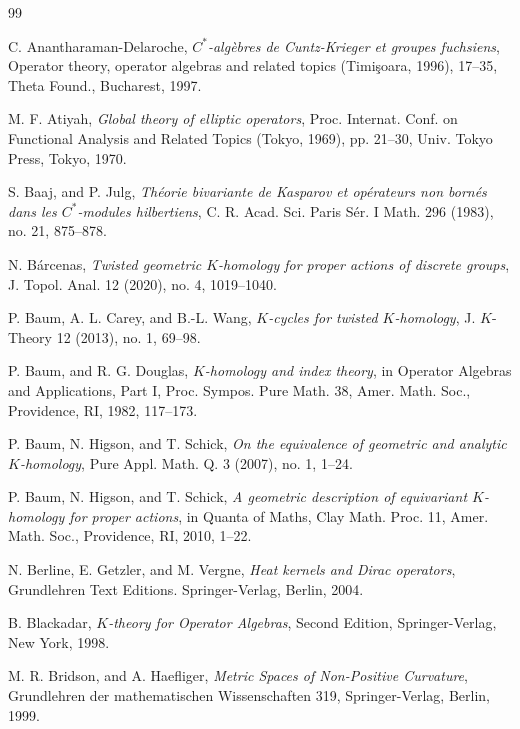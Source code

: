 \documentclass[a4paper,reqno]{amsart}
\numberwithin{equation}{section}
\theoremstyle{definition}
\theoremstyle{remark}
\begin{document}
\begin{thebibliography}{99}


 C. Anantharaman-Delaroche, \emph{$C^*$-algèbres de Cuntz-Krieger et groupes fuchsiens}, Operator theory, operator algebras and related topics (Timişoara, 1996), 17--35, Theta Found., Bucharest, 1997.


 M. F. Atiyah, \emph{Global theory of elliptic operators}, Proc. Internat. Conf. on Functional Analysis and Related Topics (Tokyo, 1969), pp. 21--30, Univ. Tokyo Press, Tokyo, 1970.


 S. Baaj, and P. Julg, \emph{Théorie bivariante de Kasparov et opérateurs non bornés dans les $C^{\ast} $-modules hilbertiens}, C. R. Acad. Sci. Paris Sér. I Math. 296 (1983), no. 21, 875--878.

 N. Bárcenas, \emph{Twisted geometric $K$-homology for proper actions of discrete groups}, J. Topol. Anal. 12 (2020), no. 4, 1019--1040.

 P. Baum, A. L. Carey, and B.-L. Wang, \emph{$K$-cycles for twisted $K$-homology}, J. $K$-Theory 12 (2013), no. 1, 69--98.

 P. Baum, and R. G. Douglas, \emph{$K$-homology and index theory}, in Operator Algebras and Applications, Part I, Proc. Sympos. Pure Math. 38, Amer. Math. Soc., Providence, RI, 1982, 117--173.

 P. Baum, N. Higson, and T. Schick, \emph{On the equivalence of geometric and analytic $K$-homology}, Pure Appl. Math. Q. 3 (2007), no. 1, 1--24.

 P. Baum, N. Higson, and T. Schick, \emph{A geometric description of equivariant $K$-homology for proper actions}, in Quanta of Maths, Clay Math. Proc. 11, Amer. Math. Soc., Providence, RI, 2010, 1--22.

 N. Berline, E. Getzler, and M. Vergne, \emph{Heat kernels and Dirac operators}, Grundlehren Text Editions. Springer-Verlag, Berlin, 2004.

 B. Blackadar, \emph{{$K$}-theory for Operator Algebras}, Second Edition, Springer-Verlag, New York, 1998.

 M. R. Bridson, and A. Haefliger, \emph{Metric Spaces of Non-Positive Curvature}, Grundlehren der mathematischen Wissenschaften 319, Springer-Verlag, Berlin, 1999.


\end{thebibliography}
\end{document}
